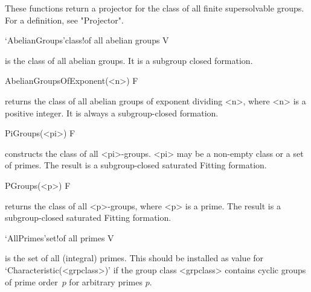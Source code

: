 These functions return a projector for the class of all finite supersolvable
groups. For a definition, see "Projector". 

\>`AbelianGroups'{class}!{of all abelian groups} V

%
%
is the class of all abelian groups. It is a subgroup closed formation.


\null


\>AbelianGroupsOfExponent(<n>) F


returns the class of all abelian groups of exponent dividing <n>, 
where <n> is
a positive integer. It is always a subgroup-closed formation.


\>PiGroups(<pi>) F


constructs the class of all <pi>-groups.  <pi> may be a non-empty class or a
set of primes. The result is a subgroup-closed saturated Fitting formation.


\>PGroups(<p>) F


returns the class of all <p>-groups, where <p> is a prime.  The result is a
subgroup-closed saturated Fitting formation.

\null

\>`AllPrimes'{set}!{of all primes} V

%
\label{AllPrimes}%
is the set of all (integral) primes. This should be
installed as value for `Characteristic(<grpclass>)' if the group class
<grpclass> contains cyclic groups of prime order~$p$ for arbitrary primes $p$.



